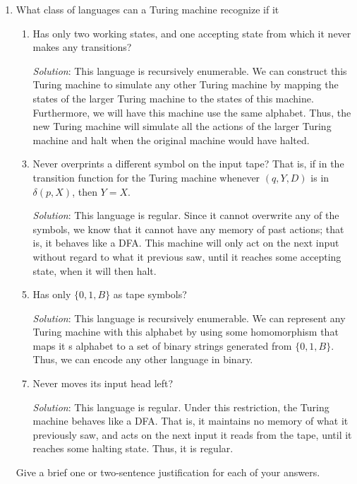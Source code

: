 \documentclass[]{article}
\begin{document}
\begin{enumerate}
\item What class of languages can a Turing machine recognize if it
\begin{enumerate}
\item Has only two working states, and one accepting state from which it never
makes any transitions?
\item[\emph{Solution}:] This language is recursively enumerable. We can construct this Turing machine to simulate any other Turing machine by mapping the states of the larger Turing machine to the states of this machine. Furthermore, we will have this machine use the same alphabet. Thus, the new Turing machine will simulate all the actions of the larger Turing machine and halt when the original machine would have halted.

\item Never overprints a different symbol on the input tape? That is, if in the
transition function for the Turing machine whenever $(q, Y, D)$ is in
$\delta(p,X)$, then $Y = X$.
\item[\emph{Solution}:] This language is regular. Since it cannot overwrite any
of the symbols, we know that it cannot have any memory of past actions; that is,
it behaves like a DFA. This machine will only act on the next input without
regard to what it previous saw, until it reaches some accepting state, when it
will then halt.

\item Has only $\{0, 1, B\}$ as tape symbols?
\item[\emph{Solution}:] This language is recursively enumerable. We can
represent any Turing machine with this alphabet by using some homomorphism that
maps it  s alphabet to a set of binary strings generated from $\{0, 1, B\}$.
Thus, we can encode any other language in binary.

\item Never moves its input head left?
\item[\emph{Solution}:] This language is regular. Under this restriction, the
Turing machine behaves like a DFA. That is, it maintains no memory of what it
previously saw, and acts on the next input it reads from the tape, until it
reaches some halting state. Thus, it is regular.
\end{enumerate}

Give a brief one or two-sentence justification for each of your answers.
\end{enumerate}
\end{document}
